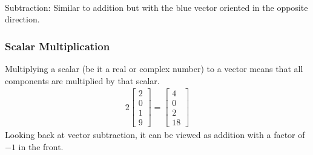 \begin{center}
\\
Subtraction: Similar to addition but with the blue vector oriented in the opposite direction.
\end{center}

\subsubsection{Scalar Multiplication} 
Multiplying a scalar (be it a real or complex number) to a vector means that all components are multiplied by that scalar.
\begin{align*}
2
\begin{bmatrix}
2 \\
0 \\
1 \\
9
\end{bmatrix}
=
\begin{bmatrix}
4 \\
0 \\
2 \\
18
\end{bmatrix}
\end{align*}
Looking back at vector subtraction, it can be viewed as addition with a factor of $-1$ in the front.
